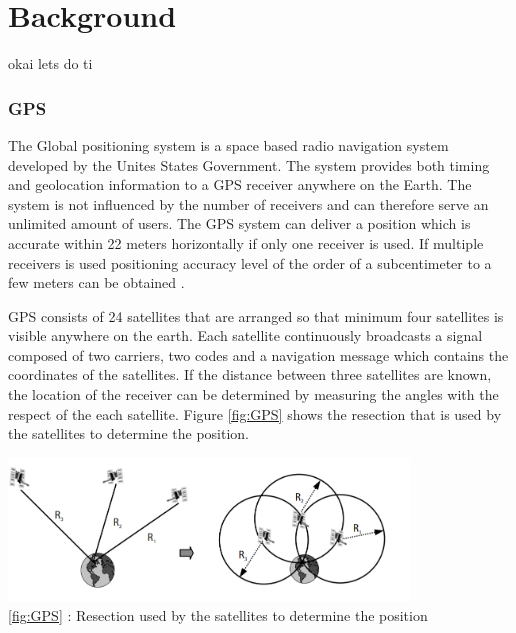 

\chapter{Background}

okai lets do ti

\subsection{GPS}
The Global positioning system is a space based radio navigation system developed by the Unites States Government.  The system provides both timing and geolocation information to a GPS receiver anywhere on the Earth.  The system is not influenced by the number of receivers and can therefore serve an unlimited amount of users. The GPS system can deliver a position which is accurate within 22 meters horizontally if only one receiver is used. If multiple receivers is used positioning accuracy level of the order of a subcentimeter to a few meters can be obtained \cite{GPS}.

GPS consists of 24 satellites that are arranged so that minimum four satellites is visible anywhere on the earth. Each satellite continuously broadcasts a signal composed of two carriers, two codes and a navigation message which contains the coordinates of the satellites.  If the distance between three satellites are known, the location of the receiver can be determined by measuring the angles with the respect of the each satellite.  Figure \ref{fig:GPS} shows the resection that is used by the satellites to determine the position.\\

\begin{minipage}[t]{0.8\textwidth}
    \centering
    \includegraphics[width=0.8\textwidth]{Images/gps.PNG}\\
    \caption{\ref{fig:GPS} : Resection used by the satellites to determine the position}
    \label{fig:GPS}
\end{minipage}
\\

